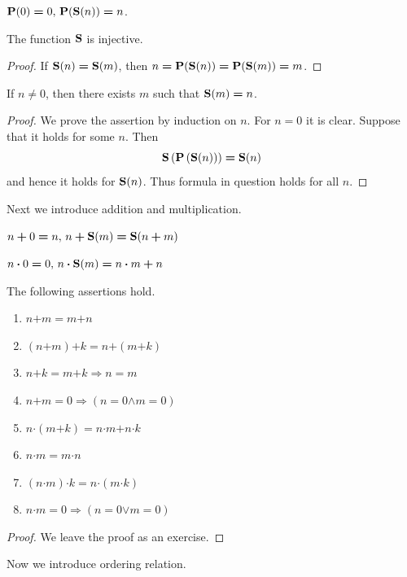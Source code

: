 \documentclass[10pt]{amsart}
\newcommand{\mra}{\boldsymbol{\Rightarrow}}
\newcommand{\mand}{\boldsymbol{\wedge}}
\newcommand{\mor}{\boldsymbol{\vee}}
\newcommand{\meq}{\boldsymbol{=}}
\newcommand{\mneq}{\boldsymbol{\neq}}
\newcommand{\mplus}{\boldsymbol{+}}
\newcommand{\mdot}{\boldsymbol{\cdot}}
\begin{document}
\begin{definition}
	$\bd{P}(0) \meq 0,\,\bd{P}(\bd{S}(n)) \meq n$.
\end{definition}

\begin{corollary}\label{corollary:the_successor_is_injective}
	The function $\mathbf{S}$ is injective.
\end{corollary}
\begin{proof}
	If $\bd{S}(n) \meq \bd{S}(m)$, then $n \meq \bd{P}(\bd{S}(n)) \meq \bd{P}(\bd{S}(m)) \meq m$.
\end{proof}

\begin{corollary}\label{corollary:nonzero_is_successor}
	If $n \mneq 0$, then there exists $m$ such that $\bd{S}(m) \meq n$.
\end{corollary}
\begin{proof}
	We prove the assertion by induction on $n$. For $n \meq 0$ it is clear. Suppose that it holds for some $n$. Then
	$$\bd{S}\left(\bd{P}\left(\bd{S}(n)\right)\right) \meq \bd{S}(n)$$
	and hence it holds for $\mathbf{S}(n)$. Thus formula in question holds for all $n$.
\end{proof}
\noindent
Next we introduce addition and multiplication.

\begin{definition}
	$n \mplus 0 \meq n,\,n \mplus \bd{S}(m) \meq \bd{S}(n \mplus m)$
\end{definition}

\begin{definition}
	$n\mdot 0 \meq 0,\,n\mdot \bd{S}(m) \meq n\mdot m \mplus n$
\end{definition}

\begin{theorem}\label{theorem:basic_properties_of_addition_and_multiplication}
	The following assertions hold.
	\begin{enumerate}[label=\emph{\textbf{(\arabic*)}}, leftmargin=3.0em]
		\item $n \mplus m \meq m \mplus n$
		\item $(n \mplus m) \mplus k \meq n \mplus (m \mplus k)$
		\item $n \mplus k \meq m \mplus k \mra n \meq m$
		\item $n \mplus m \meq 0 \mra (n \meq 0 \mand m \meq 0)$
		\item $n\mdot (m \mplus k) \meq n\mdot m \mplus n\mdot k$
		\item $n\mdot m \meq m \mdot n$
		\item $(n \mdot m) \mdot k \meq n \mdot (m \mdot k)$
		\item $n\mdot m \meq 0 \mra (n \meq 0 \mor m \meq 0)$
	\end{enumerate}
\end{theorem}
\begin{proof}
	We leave the proof as an exercise.
\end{proof}
\noindent
Now we introduce ordering relation.
\end{document}
